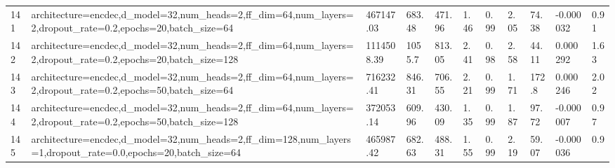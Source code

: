 \begin{longtable}{C{0.8cm} L{2cm} C{1.15cm} C{1.15cm} C{1.15cm} C{1.15cm} C{0.85cm} C{1.25cm} C{1.2cm} C{1.5cm} C{1.0cm}}
141 & architecture=encdec,\newline d\_model=32,\newline num\_heads=2,\newline ff\_dim=64,\newline num\_layers=2,\newline dropout\_rate=0.2,\newline epochs=20,\newline batch\_size=64 & 467147.03 & 683.48 & 471.96 & 1.46 & 0.99 & 2.05 & 74.38 & -0.000032 & 0.91 \\
142 & architecture=encdec,\newline d\_model=32,\newline num\_heads=2,\newline ff\_dim=64,\newline num\_layers=2,\newline dropout\_rate=0.2,\newline epochs=20,\newline batch\_size=128 & 1114508.39 & 1055.7 & 813.05 & 2.41 & 0.98 & 2.58 & 44.11 & 0.000292 & 1.63 \\
143 & architecture=encdec,\newline d\_model=32,\newline num\_heads=2,\newline ff\_dim=64,\newline num\_layers=2,\newline dropout\_rate=0.2,\newline epochs=50,\newline batch\_size=64 & 716232.41 & 846.31 & 706.55 & 2.21 & 0.99 & 1.71 & 172.8 & 0.000246 & 2.02 \\
144 & architecture=encdec,\newline d\_model=32,\newline num\_heads=2,\newline ff\_dim=64,\newline num\_layers=2,\newline dropout\_rate=0.2,\newline epochs=50,\newline batch\_size=128 & 372053.14 & 609.96 & 430.09 & 1.35 & 0.99 & 1.87 & 97.72 & -0.000007 & 0.97 \\
145 & architecture=encdec,\newline d\_model=32,\newline num\_heads=2,\newline ff\_dim=128,\newline num\_layers=1,\newline dropout\_rate=0.0,\newline epochs=20,\newline batch\_size=64 & 465987.42 & 682.63 & 488.31 & 1.55 & 0.99 & 2.19 & 59.07 & -0.000036 & 0.9 \\

\end{longtable}
